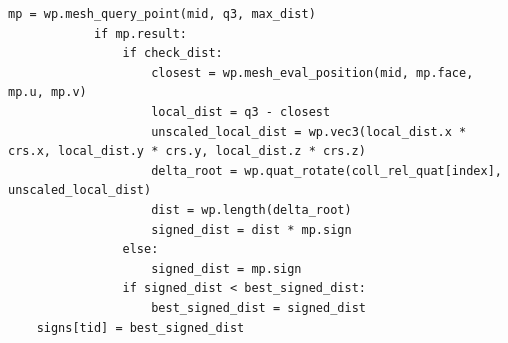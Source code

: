 \begin{snippetbox}[12]
\begin{lstlisting}[firstnumber=293]
            mp = wp.mesh_query_point(mid, q3, max_dist)
            if mp.result:
                if check_dist:
                    closest = wp.mesh_eval_position(mid, mp.face, mp.u, mp.v)
                    local_dist = q3 - closest
                    unscaled_local_dist = wp.vec3(local_dist.x * crs.x, local_dist.y * crs.y, local_dist.z * crs.z)
                    delta_root = wp.quat_rotate(coll_rel_quat[index], unscaled_local_dist)
                    dist = wp.length(delta_root)
                    signed_dist = dist * mp.sign
                else:
                    signed_dist = mp.sign
                if signed_dist < best_signed_dist:
                    best_signed_dist = signed_dist
    signs[tid] = best_signed_dist
\end{lstlisting}
\end{snippetbox}
